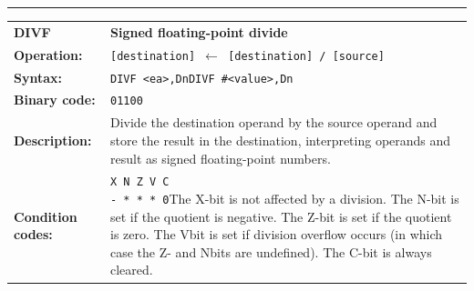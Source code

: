 \documentclass[]{article}
\begin{document}
\begin{appendices}
\noindent\rule{10cm}{1pt}\newline %
\setlength\extrarowheight{5pt} %
\begin{tabularx}{\textwidth}{lL}
  {\Large \textbf{DIVF}} 	& {\Large \textbf{Signed floating-point divide}}\\
  \textbf{Operation:} 		& \texttt{[destination] $\leftarrow$ [destination] / [source]}\\
  \textbf{Syntax:}  		& \texttt{DIVF <ea>,Dn}\newline\texttt{DIVF \#<value>,Dn}\\
  \textbf{Binary code:} 	& \texttt{01100}\\
  \textbf{Description:}  	& Divide the destination operand by the source operand and store
the result in the destination, interpreting operands and result as signed floating-point numbers.\\
  \textbf{Condition codes:} & \texttt{X N Z V C\newline - * * * 0}\newline\newline The X-bit is not affected by a division. The N-bit is set if the
quotient is negative. The Z-bit is set if the quotient is zero. The Vbit
is set if division overflow occurs (in which case the Z- and Nbits
are undefined). The C-bit is always cleared.\\
\end{tabularx}
\newline


\end{appendices}
\end{document}

